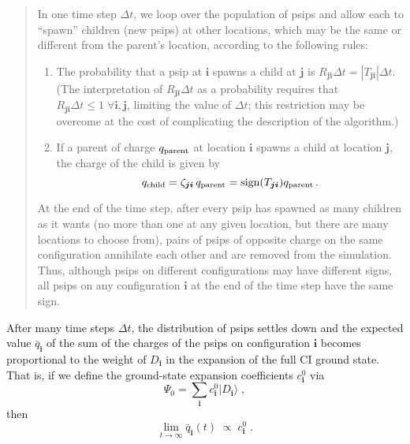 \documentclass{article}
\newcommand{\bi}{\boldsymbol{i}}
\newcommand{\bj}{\boldsymbol{j}}
\begin{document}
\begin{quotation}

\noindent In one time step $\Delta t$, we loop over the population of
psips and allow each to ``spawn'' children (new psips) at other
locations, which may be the same or different from the parent's
location, according to the following rules:
  \begin{enumerate}
    \item The probability that a psip at $\bi$ spawns a child at $\bj$
      is $R_{\bj\bi} \Delta t = |T_{\bj\bi}| \Delta t$. (The
      interpretation of $R_{\bj\bi}\Delta t$ as a probability requires
      that $R_{\bj\bi}\Delta t \leq 1 \; \forall \bi,\bj$, limiting
      the value of $\Delta t$; this restriction may be overcome at the
      cost of complicating the description of the algorithm.)
    \item If a parent of charge $q_{\rm parent}$ at location $\bi$
      spawns a child at location $\bj$, the charge of the child is
      given by
      \begin{displaymath}
        q_{\rm child} = \zeta_{\bj\bi} \, q_{\rm parent} = 
        \mbox{sign}(T_{\bj\bi}) q_{\rm parent} \,.
      \end{displaymath}
  \end{enumerate}
At the end of the time step, after every psip has spawned as many
children as it wants (no more than one at any given location, but
there are many locations to choose from), pairs of psips of opposite
charge on the same configuration annihilate each other and are removed
from the simulation. Thus, although psips on different configurations
may have different signs, all psips on any configuration $\bi$ at the
end of the time step have the same sign.

\end{quotation}

After many time steps $\Delta t$, the distribution of psips settles
down and the expected value $\bar{q}_{\bi}$ of the sum of the charges
of the psips on configuration $\bi$ becomes proportional to the weight
of $D_{\bi}$ in the expansion of the full CI ground state. That is, if
we define the ground-state expansion coefficients $c_{\bi}^{0}$ via
\begin{displaymath}
\Psi_0 = \sum_{\bi} c_{\bi}^{0} |D_{\bi}\rangle \;,
\end{displaymath}
then
\begin{displaymath}
\lim_{t\rightarrow\infty} \bar{q}_{\bi}^{\,}(t) \; \propto \; c_{\bi}^0 \;.
\end{displaymath}
\end{document}
